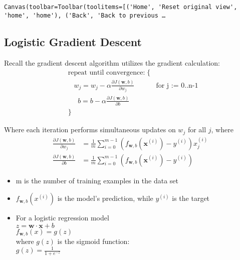 \documentclass[11pt]{article}
\providecommand{\tightlist}{%
      \setlength{\itemsep}{0pt}\setlength{\parskip}{0pt}}
\begin{document}
    
    \begin{verbatim}
Canvas(toolbar=Toolbar(toolitems=[('Home', 'Reset original view', 'home', 'home'), ('Back', 'Back to previous …
    \end{verbatim}

    
    \hypertarget{logistic-gradient-descent}{%
\subsection{Logistic Gradient Descent}\label{logistic-gradient-descent}}

Recall the gradient descent algorithm utilizes the gradient calculation:
\[\begin{align*}
&\text{repeat until convergence:} \; \lbrace \\
&  \; \; \;w_j = w_j -  \alpha \frac{\partial J(\mathbf{w},b)}{\partial w_j} \tag{1}  \; & \text{for j := 0..n-1} \\ 
&  \; \; \;  \; \;b = b -  \alpha \frac{\partial J(\mathbf{w},b)}{\partial b} \\
&\rbrace
\end{align*}\]

Where each iteration performs simultaneous updates on \(w_j\) for all
\(j\), where \[\begin{align*}
\frac{\partial J(\mathbf{w},b)}{\partial w_j}  &= \frac{1}{m} \sum\limits_{i = 0}^{m-1} (f_{\mathbf{w},b}(\mathbf{x}^{(i)}) - y^{(i)})x_{j}^{(i)} \tag{2} \\
\frac{\partial J(\mathbf{w},b)}{\partial b}  &= \frac{1}{m} \sum\limits_{i = 0}^{m-1} (f_{\mathbf{w},b}(\mathbf{x}^{(i)}) - y^{(i)}) \tag{3} 
\end{align*}\]

\begin{itemize}
\tightlist
\item
  m is the number of training examples in the data set\\
\item
  \(f_{\mathbf{w},b}(x^{(i)})\) is the model's prediction, while
  \(y^{(i)}\) is the target
\item
  For a logistic regression model\\
  \(z = \mathbf{w} \cdot \mathbf{x} + b\)\\
  \(f_{\mathbf{w},b}(x) = g(z)\)\\
  where \(g(z)\) is the sigmoid function:\\
  \(g(z) = \frac{1}{1+e^{-z}}\)
\end{itemize}
\end{document}

